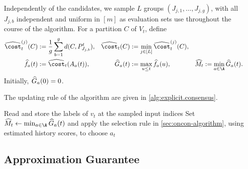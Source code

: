 Independently of the candidates, we sample $ L $ groups $ (J_{j,1},\ldots,J_{j,g}) $, with all $ J_{j,b} $ independent and uniform in $ [m] $ as evaluation sets use throughout the course of the algorithm.
For a partition $ C $ of $ V_t $, define
\begin{align}
    \edmean{j}{t}(C)&:=\frac1g\sum_{b=1}^g d(C,P_{J_{j,b}}^t),
    &\edcost{t}(C)&:=\min_{j\in[L]}\edmean{j}{t}(C),\label{eq:explicit.consensus.estimates}\\
    \edscore{a}{t}&:=\edcost{t}(A_a(t)),
    &\edhistory{a}{t}&:=\max_{u\le t}\edscore{a}{u},
    &\edminimum{t}&:=\min_{a\in\A}\edhistory{a}{t}.\nonumber
\end{align}
Initially, $ \widehat G_{a}(0)=0 $.

The updating rule of the algorithm are given in \cref{alg:explicit.consensus}.


\begin{algorithm}[htbp]
    \DontPrintSemicolon
    Read and store the labels of $ v_t $ at the sampled input indices\;
    Set $ \edminimum{t}\gets\min_{a\in\A}\edhistory{a}{t} $ and apply the selection rule in \cref{sec:oncon-algorithm}, using estimated history scores, to choose $ a_t $\;
    \caption{Explicit dynamic consensus-clustering algorithm.}
    \label{alg:explicit.consensus}
\end{algorithm}

\subsection{Approximation Guarantee}\label{subsec:explicit.consensus.approximation}

